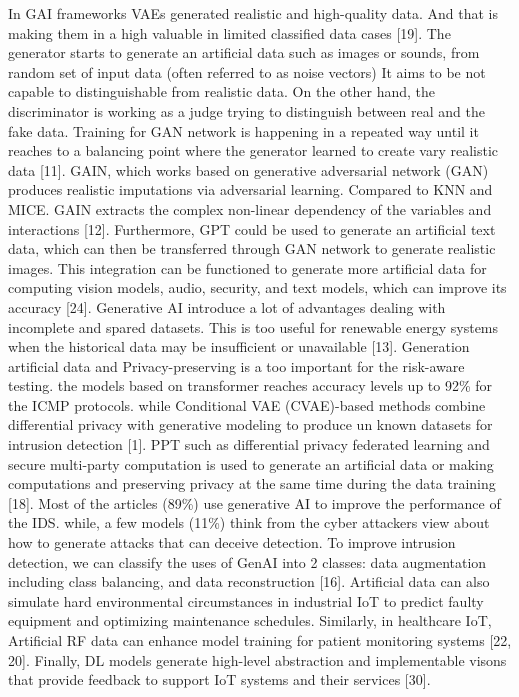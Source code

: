 \documentclass[journal]{IEEEtran}
\begin{document}
In GAI frameworks VAEs generated realistic and high-quality data. And that is making them in a high valuable in limited classified data cases [19]. The generator starts to generate an artificial data such as images or sounds, from random set of input data (often referred to as noise vectors) It aims to be not capable to distinguishable from realistic data. On the other hand, the discriminator is working as a judge trying to distinguish between real and the fake data. Training for GAN network is happening in a repeated way until it reaches to a balancing point where the generator learned to create vary realistic data [11]. GAIN, which works based on generative adversarial network (GAN) produces realistic imputations via adversarial learning. Compared to KNN and MICE. GAIN extracts the complex non-linear dependency of the variables and interactions [12].
Furthermore, GPT could be used to generate an artificial text data, which can then be transferred through GAN network to generate realistic images. This integration can be functioned to generate more artificial data for computing vision models, audio, security, and text models, which can improve its accuracy [24]. Generative AI introduce a lot of advantages dealing with incomplete and spared datasets. This is too useful for renewable energy systems when the historical data may be insufficient or unavailable [13].
Generation artificial data and Privacy-preserving is a too important for the risk-aware testing. the models based on transformer reaches accuracy levels up to 92\% for the ICMP protocols. while Conditional VAE (CVAE)-based methods combine differential privacy with generative modeling to produce un known datasets for intrusion detection [1]. PPT such as differential privacy federated learning and secure multi-party computation is used to generate an artificial data or making computations and preserving privacy at the same time during the data training [18].
Most of the articles (89\%) use generative AI to improve the performance of the IDS. while, a few models (11\%) think from the cyber attackers view about how to generate attacks that can deceive detection. To improve intrusion detection, we can classify the uses of GenAI into 2 classes: data augmentation including class balancing, and data reconstruction [16]. Artificial data can also simulate hard environmental circumstances in industrial IoT to predict faulty equipment and optimizing maintenance schedules. Similarly, in healthcare IoT, Artificial RF data can enhance model training for patient monitoring systems [22, 20]. Finally, DL models generate high-level abstraction and implementable visons that provide feedback to support IoT systems and their services [30].
\end{document}
